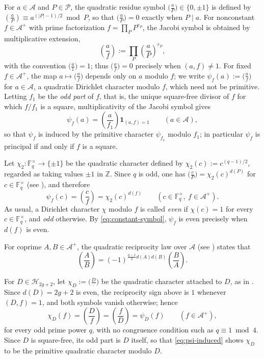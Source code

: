 \documentclass[a4paper,reqno]{amsart}
\numberwithin{equation}{section}
\theoremstyle{remark}
\theoremstyle{definition}
\newcommand{\A}{\mathcal{A}}
\begin{document}
For $a\in\A$ and $P\in\mathcal{P}$, the quadratic residue symbol
$\bigl(\frac{a}{P}\bigr)\in\{0,\pm1\}$ is defined by
$\left(\frac{a}{P}\right)\equiv a^{(|P|-1)/2}\bmod P$,
so that $\bigl(\frac{a}{P}\bigr)=0$ exactly when $P\mid a$. For
nonconstant $f\in\A^+$ with prime factorization $f=\prod_PP^{e_P}$, the
Jacobi symbol is obtained by multiplicative extension,
$$
\left(\frac{a}{f}\right):=\prod_P\left(\frac{a}{P}\right)^{e_P},
$$
with the convention $\bigl(\frac{a}{1}\bigr)=1$; thus
$\bigl(\frac{a}{f}\bigr)=0$ precisely when $(a,f)\ne1$. For fixed
$f\in\A^+$, the map $a\mapsto\bigl(\frac{a}{f}\bigr)$ depends only on
$a$ modulo $f$; we write $\psi_f(a):=\bigl(\frac{a}{f}\bigr)$ for $a\in\A$, a
quadratic Dirichlet character modulo $f$, which need not be primitive.
Letting $f_1$ be the \emph{odd part} of $f$, that is, the unique square-free
divisor of $f$ for which $f/f_1$ is a square, multiplicativity of the Jacobi
symbol gives
\begin{equation}\label{eq:psi-induced}
\psi_f(a)=\left(\frac{a}{f_1}\right)\mathbf 1_{(a,f)=1}
\qquad(a\in\A),
\end{equation}
so that $\psi_f$ is induced by the primitive character $\psi_{f_1}$ modulo
$f_1$; in particular $\psi_f$ is principal if and only if $f$ is a square.

Let $\chi_2:\mathbb F_q^\times\to\{\pm1\}$ be the quadratic character
defined by $\chi_2(c):=c^{(q-1)/2}$, regarded as taking values $\pm1$ in $\mathbb Z$.
Since $q$ is odd, one has $\bigl(\frac{c}{P}\bigr)=\chi_2(c)^{d(P)}$ for
$c\in\mathbb F_q^\times$ (see \cite[Chapter~3]{Ro02}), and therefore
\begin{equation}\label{eq:constant-symbol}
\psi_f(c)=\left(\frac{c}{f}\right)=\chi_2(c)^{d(f)}
\qquad
(c\in\mathbb F_q^\times,\ f\in\A^+).
\end{equation}
As usual, a Dirichlet character $\chi$ modulo $f$ is called \emph{even} if
$\chi(c)=1$ for every $c\in\mathbb F_q^\times$, and \emph{odd} otherwise.
By \eqref{eq:constant-symbol}, $\psi_f$ is even precisely when $d(f)$ is
even.

For coprime $A,B\in\A^+$, the quadratic reciprocity law over $\A$
(see \cite[Chapter~3]{Ro02}) states that
$$
\left(\frac{A}{B}\right)
=
(-1)^{\frac{q-1}{2}d(A)d(B)}
\left(\frac{B}{A}\right).
$$

For $D\in\mathcal H_{2g+2}$, let $\chi_D:=\bigl(\frac{D}{\cdot}\bigr)$ be the
quadratic character attached to $D$, as in \cite{Fl17-1,Ju20,AM-21}. Since
$d(D)=2g+2$ is even, the reciprocity sign above is $1$ whenever $(D,f)=1$,
and both symbols vanish otherwise; hence
\begin{equation}\label{eq:reciprocity-even}
\chi_D(f)=\left(\frac{D}{f}\right)=\left(\frac{f}{D}\right)=\psi_D(f)
\qquad(f\in\A^+),
\end{equation}
for every odd prime power $q$, with no congruence condition such as
$q\equiv1\bmod4$.
Since $D$ is square-free, its odd part is $D$ itself, so that
\eqref{eq:psi-induced} shows $\chi_D$ to be the primitive quadratic
character modulo $D$.
\end{document}
